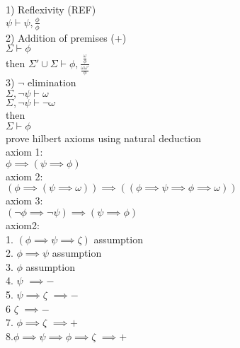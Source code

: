 \documentclass[12pt,oneside,notitlepage]{book}
\theoremstyle{definition}
\begin{document}
1) Reflexivity (REF) \\
$\psi \vdash \psi, \frac{\phi}{\phi}$ \\
2) Addition of premises (+) \\
$\Sigma \vdash \phi$ \\
then $\Sigma' \cup \Sigma \vdash \phi, \frac{ \frac{\omega}{\phi}}{\frac{\omega \omega'}{\phi}}$ \\
3) $\neg$ elimination \\
$\Sigma, \neg \psi \vdash \omega$ \\
$\Sigma, \neg \psi \vdash \neg \omega$ \\
then \\
$\Sigma \vdash \phi$ \\

prove hilbert axioms using natural deduction \\

axiom 1: \\
$\phi \implies (\psi \implies \phi)$ \\
axiom 2: \\
$(\phi \implies (\psi \implies \omega)) \implies ((\phi \implies \psi \implies \phi \implies \omega))$ \\
axiom 3: \\
$(\neg \phi \implies \neg \psi) \implies (\psi \implies \phi)$ \\
 
axiom2: \\
1. $(\phi \implies \psi \implies \zeta)$ assumption \\
2.     $\phi \implies \psi$ assumption \\
3.			$\phi$ assumption \\
4. 			$\psi$ $\implies -$ \\
5.			$\psi \implies \zeta$ $\implies -$ \\
6			$\zeta$ $\implies -$ \\
7.		$\phi \implies \zeta$ $\implies +$ \\
8.$\phi \implies \psi \implies \phi \implies \zeta$ $\implies +$ \\
\end{document}
